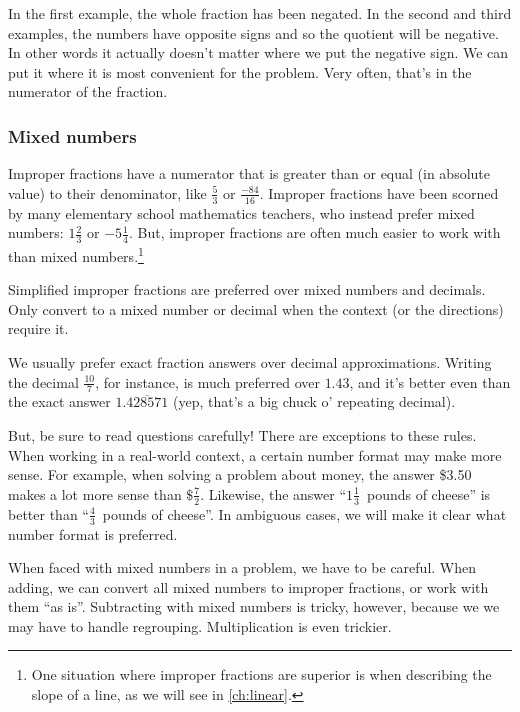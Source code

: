 In the first example, the whole fraction has been negated. In the second and third examples, the numbers have opposite signs and so the quotient will be negative. In other words it actually doesn't matter where we put the negative sign. We can put it where it is most convenient for the problem. Very often, that's in the numerator of the fraction.

\subsubsection{Mixed numbers}

Improper fractions have a numerator that is greater than or equal (in absolute value) to their denominator, like $\frac{5}{3}$ or $\frac{-84}{16}$. Improper fractions have been scorned by many elementary school mathematics teachers, who instead prefer mixed numbers: $1\frac{2}{3}$ or $-5\frac{1}{4}$. But, improper fractions are often much easier to work with than mixed numbers.\footnote{One situation where improper fractions are superior is when describing the slope of a line, as we will see in \cref{ch:linear}.}

\begin{boxcrit}
Simplified \glspl{improper fraction} are preferred over \glspl{mixed number} and decimals. Only convert to a mixed number or decimal when the context (or the directions) require it.
\end{boxcrit}

We usually prefer exact fraction answers over decimal approximations. Writing the decimal $\frac{10}{7}$, for instance, is much preferred over $1.43$, and it's better even than the exact answer $1.\overline{428571}$ (yep, that's a big chuck o' repeating decimal).

But, be sure to read questions carefully! There are exceptions to these rules. When working in a real-world context, a certain number format may make more sense. For example, when solving a problem about money, the answer \$3.50 makes a lot more sense than $\$\frac{7}{2}$. Likewise, the answer ``$1\frac{1}{3}$~pounds of cheese'' is better than ``$\frac{4}{3}$~pounds of cheese''. In ambiguous cases, we will make it clear what number format is preferred.

When faced with mixed numbers in a problem, we have to be careful. When adding, we can convert all mixed numbers to improper fractions, or work with them ``as is''. Subtracting with mixed numbers is tricky, however, because we we may have to handle regrouping. Multiplication is even trickier.

